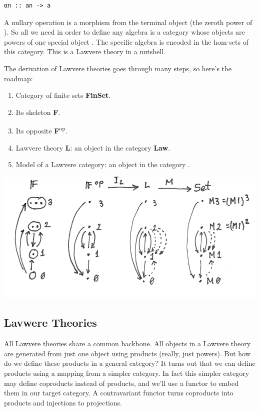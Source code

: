 \begin{verbatim}
αn :: an -> a
\end{verbatim}

A nullary operation is a morphism from the terminal object (the zeroth
power of ). So all we need in order to define any algebra is a
category whose objects are powers of one special object . The
specific algebra is encoded in the hom-sets of this category. This is a
Lawvere theory in a nutshell.

The derivation of Lawvere theories goes through many steps, so here's
the roadmap:

\begin{enumerate}
\tightlist
\item
  Category of finite sets \textbf{FinSet}.
\item
  Its skeleton \textbf{F}.
\item
  Its opposite \textbf{F}\textsuperscript{op}.
\item
  Lawvere theory \textbf{L}: an object in the category \textbf{Law}.
\item
  Model  of a Lawvere category: an object in the category
  .
\end{enumerate}

\includegraphics[width=5.31250in]{images/lawvere1.png}

\subsection{Lavwere Theories}\label{lavwere-theories}

All Lawvere theories share a common backbone. All objects in a Lawvere
theory are generated from just one object using products (really, just
powers). But how do we define these products in a general category? It
turns out that we can define products using a mapping from a simpler
category. In fact this simpler category may define coproducts instead of
products, and we'll use a  functor to embed them in
our target category. A contravariant functor turns coproducts into
products and injections to projections.

